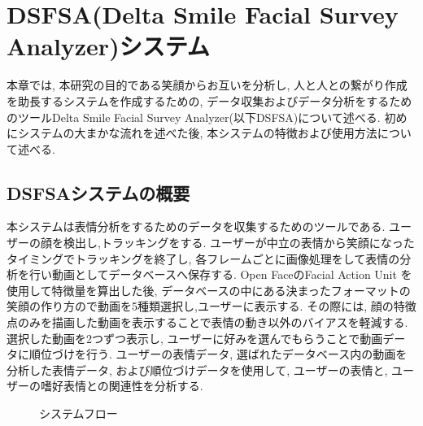 \chapter{DSFSA(Delta Smile Facial Survey Analyzer)システム}
\label{chap:aboutDSFSA}

本章では, 本研究の目的である笑顔からお互いを分析し, 人と人との繋がり作成を助長するシステムを作成するための,
データ収集およびデータ分析をするためのツールDelta Smile Facial Survey Analyzer(以下DSFSA)について述べる.
初めにシステムの大まかな流れを述べた後, 本システムの特徴および使用方法について述べる.


\section{DSFSAシステムの概要}
本システムは表情分析をするためのデータを収集するためのツールである.
ユーザーの顔を検出し,トラッキングをする.
ユーザーが中立の表情から笑顔になったタイミングでトラッキングを終了し,
各フレームごとに画像処理をして表情の分析を行い動画としてデータベースへ保存する.
Open FaceのFacial Action Unit を使用して特徴量を算出した後,
データベースの中にある決まったフォーマットの笑顔の作り方ので動画を5種類選択し,ユーザーに表示する.
その際には, 顔の特徴点のみを描画した動画を表示することで表情の動き以外のバイアスを軽減する.
選択した動画を2つずつ表示し, ユーザーに好みを選んでもらうことで動画データに順位づけを行う.
ユーザーの表情データ, 選ばれたデータベース内の動画を分析した表情データ, および順位づけデータを使用して,
ユーザーの表情と, ユーザーの嗜好表情との関連性を分析する.

\begin{figure}[htbp]
    \begin{center}
    \end{center}
    \caption{システムフロー}
    \label{fig:system_architecture}
\end{figure}


